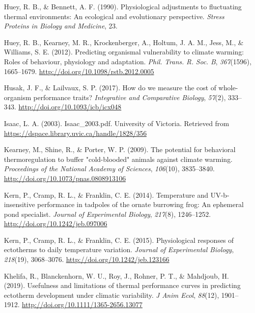 \documentclass[12pt,twoside]{reedthesis}
\begin{document}
\leavevmode\hypertarget{ref-huey_physiological_1990}{}%
Huey, R. B., \& Bennett, A. F. (1990). Physiological adjustments to fluctuating thermal environments: An ecological and evolutionary perspective. \emph{Stress Proteins in Biology and Medicine}, 23.

\leavevmode\hypertarget{ref-huey_predicting_2012}{}%
Huey, R. B., Kearney, M. R., Krockenberger, A., Holtum, J. A. M., Jess, M., \& Williams, S. E. (2012). Predicting organismal vulnerability to climate warming: Roles of behaviour, physiology and adaptation. \emph{Phil. Trans. R. Soc. B}, \emph{367}(1596), 1665--1679. \url{http://doi.org/10.1098/rstb.2012.0005}

\leavevmode\hypertarget{ref-husak_how_2017}{}%
Husak, J. F., \& Lailvaux, S. P. (2017). How do we measure the cost of whole-organism performance traits? \emph{Integrative and Comparative Biology}, \emph{57}(2), 333--343. \url{http://doi.org/10.1093/icb/icx048}

\leavevmode\hypertarget{ref-isaac_isaac_2003pdf_2003}{}%
Isaac, L. A. (2003). Isaac\_2003.pdf. University of Victoria. Retrieved from \url{https://dspace.library.uvic.ca/handle/1828/356}

\leavevmode\hypertarget{ref-kearney_potential_2009}{}%
Kearney, M., Shine, R., \& Porter, W. P. (2009). The potential for behavioral thermoregulation to buffer "cold-blooded" animals against climate warming. \emph{Proceedings of the National Academy of Sciences}, \emph{106}(10), 3835--3840. \url{http://doi.org/10.1073/pnas.0808913106}

\leavevmode\hypertarget{ref-kern_temperature_2014}{}%
Kern, P., Cramp, R. L., \& Franklin, C. E. (2014). Temperature and UV-b-insensitive performance in tadpoles of the ornate burrowing frog: An ephemeral pond specialist. \emph{Journal of Experimental Biology}, \emph{217}(8), 1246--1252. \url{http://doi.org/10.1242/jeb.097006}

\leavevmode\hypertarget{ref-kern_physiological_2015-3}{}%
Kern, P., Cramp, R. L., \& Franklin, C. E. (2015). Physiological responses of ectotherms to daily temperature variation. \emph{Journal of Experimental Biology}, \emph{218}(19), 3068--3076. \url{http://doi.org/10.1242/jeb.123166}

\leavevmode\hypertarget{ref-khelifa_usefulness_2019}{}%
Khelifa, R., Blanckenhorn, W. U., Roy, J., Rohner, P. T., \& Mahdjoub, H. (2019). Usefulness and limitations of thermal performance curves in predicting ectotherm development under climatic variability. \emph{J Anim Ecol}, \emph{88}(12), 1901--1912. \url{http://doi.org/10.1111/1365-2656.13077}
\end{document}
